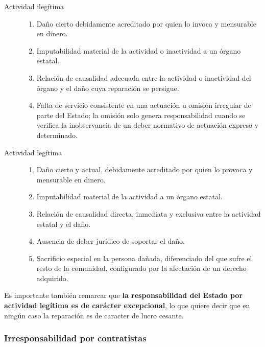 \documentclass[../resumen.tex]{subfiles}
\begin{document}
\begin{description}
  \item[Actividad ilegítima] 

    \begin{enumerate}
      \item Daño cierto debidamente acreditado por quien lo invoca y mensurable
        en dinero.
      \item Imputabilidad material de la actividad o inactividad a un órgano
        estatal.
      \item Relación de causalidad adecuada entre la actividad o inactividad del
        órgano y el daño cuya reparación se persigue.
      \item Falta de servicio consistente en una actuación u omisión irregular de
        parte del Estado; la omisión solo genera responsabilidad cuando se 
        verifica la inobservancia de un deber normativo de actuación expreso 
        y determinado.
    \end{enumerate}
  \item[Actividad legítima] 
    
    \begin{enumerate}
      \item Daño cierto y actual, debidamente acreditado por quien lo provoca y 
        mensurable en dinero.
      \item Imputabilidad material de la actividad a un órgano estatal.
      \item Relación de causalidad directa, inmediata y exclusiva entre la 
        actividad estatal y el daño.
      \item Ausencia de deber jurídico de soportar el daño.
      \item Sacrificio especial en la persona dañada, diferenciado del que sufre
        el resto de la comunidad, configurado por la afectación de un derecho
        adquirido.
    \end{enumerate}
\end{description}

Es importante también remarcar que \textbf{la responsabilidad del Estado por}
\textbf{actividad legítima es de carácter excepcional}, lo que quiere decir que en
ningún caso la reparación es de caracter de lucro cesante.

\subsubsection{Irresponsabilidad por contratistas}
\end{document}
